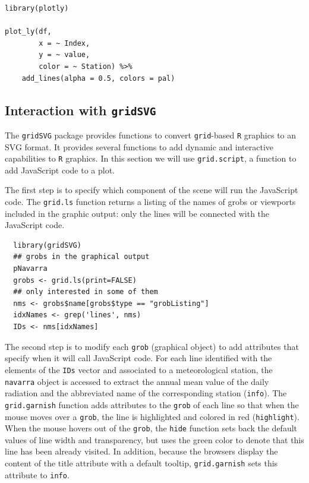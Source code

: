\documentclass[smallroyalvopaper]{memoir}
\begin{document}
\lstset{language=r,label= ,caption= ,captionpos=b,numbers=none}
\begin{lstlisting}
library(plotly)

plot_ly(df,
        x = ~ Index,
        y = ~ value,
        color = ~ Station) %>%
    add_lines(alpha = 0.5, colors = pal)
\end{lstlisting}

\subsection{\floweroneleft Interaction with \texttt{gridSVG}}
\label{sec:org448ed5d}
The \texttt{gridSVG} package provides functions to convert \texttt{grid}-based \texttt{R}
graphics to an SVG format. It provides several functions to add
dynamic and interactive capabilities to \texttt{R} graphics. In this section
we will use \texttt{grid.script}, a function to add JavaScript code to a
plot.

The first step is to specify which component of the scene
will run the JavaScript code. The \texttt{grid.ls} function  returns a
listing of the names of grobs or viewports included in the graphic
output: only the lines will be connected with the JavaScript
code. 


\lstset{language=r,label= ,caption= ,captionpos=b,numbers=none}
\begin{lstlisting}
  library(gridSVG)
  ## grobs in the graphical output
  pNavarra
  grobs <- grid.ls(print=FALSE)
  ## only interested in some of them
  nms <- grobs$name[grobs$type == "grobListing"]
  idxNames <- grep('lines', nms)
  IDs <- nms[idxNames]
\end{lstlisting}

The second step is to modify each \texttt{grob} (graphical object) to add
attributes that specify when it will call JavaScript code. For each
line identified with the elements of the \texttt{IDs} vector and associated
to a meteorological station, the \texttt{navarra} object is accessed to
extract the annual mean value of the daily radiation and the
abbreviated name of the corresponding station (\texttt{info}).  The
\texttt{grid.garnish} function adds attributes to the \texttt{grob} of each line so
that when the mouse moves over a \texttt{grob}, the line is highlighted and
colored in red (\texttt{highlight}). When the mouse hovers out of the \texttt{grob},
the \texttt{hide} function sets back the default values of line width and
transparency, but uses the green color to denote that this line has
been already visited. In addition, because the browsers display the
content of the title attribute with a default tooltip, \texttt{grid.garnish}
sets this attribute to \texttt{info}.
\end{document}
